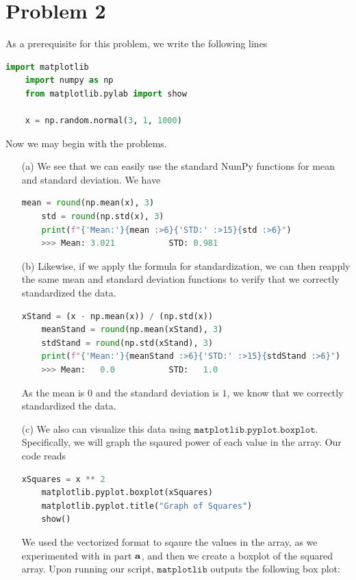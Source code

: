 \documentclass[12pt, letterpaper]{article}
\begin{document}
\section*{Problem 2}
As a prerequisite for this problem, we write the following lines 
\begin{lstlisting}[language=python]
    import matplotlib
    import numpy as np
    from matplotlib.pylab import show
    
    x = np.random.normal(3, 1, 1000)
\end{lstlisting}
Now we may begin with the problems.
\newpage
\begin{enumerate}
    \item [(a)] We see that we can easily use the standard NumPy functions 
    for mean and standard deviation. We have 
\begin{lstlisting}[language=python]
    mean = round(np.mean(x), 3)
    std = round(np.std(x), 3)
    print(f"{'Mean:'}{mean :>6}{'STD:' :>15}{std :>6}")
    >>> Mean: 3.021           STD: 0.981
\end{lstlisting}
    \item [(b)] Likewise, if we apply the formula for standardization, we can then 
    reapply the same mean and standard deviation functions to verify that we correctly 
    standardized the data. 
\begin{lstlisting}[language=python]
    xStand = (x - np.mean(x)) / (np.std(x))
    meanStand = round(np.mean(xStand), 3)
    stdStand = round(np.std(xStand), 3)
    print(f"{'Mean:'}{meanStand :>6}{'STD:' :>15}{stdStand :>6}")
    >>> Mean:   0.0           STD:   1.0
\end{lstlisting}
    As the mean is $0$ and the standard deviation is $1$, we know that we correctly 
    standardized the data.
    \item [(c)] We also can visualize this data using $\texttt{matplotlib.pyplot.boxplot}$. 
        Specifically, we will graph the sqaured power of each value in the array. Our code reads 
\begin{lstlisting}[language=python]
    xSquares = x ** 2
    matplotlib.pyplot.boxplot(xSquares)
    matplotlib.pyplot.title("Graph of Squares")
    show()
\end{lstlisting}
    We used the vectorized format to sqaure the values in the array, as we experimented with 
    in part ${\bf a}$, and then we create a boxplot of the squared array. Upon running our 
    script, $\texttt{matplotlib}$ outputs the following box plot:
    \[
\]
\end{enumerate}
\end{document}
